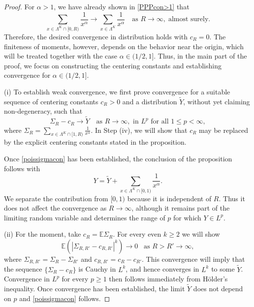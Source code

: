 \documentclass[11pt,twoside,a4paper,reqno]{amsart}
\newcommand{\as}[1]{\text{as } #1 \rightarrow\infty}
\newcommand{\E}{\mathbb{E}}
\begin{document}
\begin{proof}
For $\alpha>1$, we have already shown in \eqref{PPPcon>1} that
\begin{equation*}
\sum_{x\in \Lambda^K \cap [0,R)} \frac{1}{x^{\alpha}}
\rightarrow
\sum_{x\in \Lambda^K} \frac{1}{x^{\alpha}}
\quad \as{R},
\; \text{almost surely}.
\end{equation*}
Therefore, the desired convergence in distribution holds with $c_R=0$. The finiteness of moments, however, depends on the behavior near the origin, which will be treated together with the case $\alpha\in(1/2,1]$. Thus, in the main part of the proof, we focus on constructing the centering constants and establishing convergence for $\alpha\in(1/2,1]$.





(i) To establish weak convergence, we first
prove convergence for a suitable sequence of centering constants $c_R>0$ and a distribution $\tilde{Y}$, without yet claiming non-degeneracy, such that
\begin{equation}\label{poissigmacon}
\Sigma_R - c_R \rightarrow \tilde{Y}\quad \as{R}, \text{ in } L^p \text{ for all } 1\leq p < \infty,
\end{equation}
where $\Sigma_R=\sum_{x\in \Lambda^K \cap [1,R)} \frac{1}{x^{\alpha}}$.
In Step (iv), we will show that $c_R$ may be replaced by the explicit centering constants stated in the proposition.



Once \eqref{poissigmacon} has been established, the conclusion of the proposition follows with
\begin{equation*}
Y= \tilde{Y}+\sum_{x\in \Lambda^K \cap [0,1)} \frac{1}{x^{\alpha}}.
\end{equation*}
We separate the contribution from $[0,1)$ because it is independent of $R$. Thus it does not affect the convergence as $R\to\infty$, although it remains part of the limiting random variable and determines the range of $p$ for which $Y\in L^p$.

(ii) For the moment, take $c_R=\E \Sigma_R$. For every even $k\geq 2$ we will show
\begin{equation}\label{PPPtrimlemvar1}
\E\left( \left|\Sigma_{R,R'} - c_{R,R'}\right|^k \right) \rightarrow 0 \;\;\;\as{R>R'},
\end{equation}
where $ \Sigma_{R,R'} =\Sigma_R - \Sigma_{R'}$ and $c_{R,R'}=c_R-c_{R'}$. This convergence will imply that the sequence $\{\Sigma_R-c_R\}$ is Cauchy in $L^k$, and hence converges in $L^k$ to some $\tilde{Y}$. Convergence in $L^p$ for every $p\geq 1$  then follows immediately from  H\"{o}lder's inequality. Once convergence has been established, the limit $\tilde{Y}$ does not depend on $p$ and \eqref{poissigmacon} follows.





\end{proof}
\end{document}
